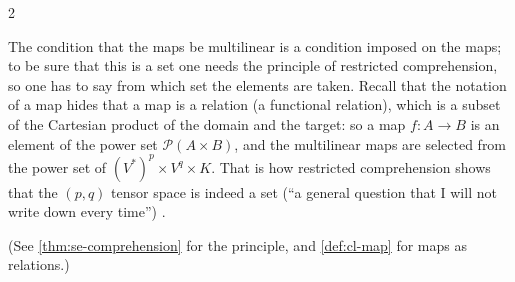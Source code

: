 \begin{paracol}{2}
\begin{secondary}
The condition that the maps be multilinear is a condition imposed on the maps; to be sure that this is a set one needs the principle of restricted comprehension, so one has to say from which set the elements are taken. Recall that the notation of a map hides that a map is a relation (a functional relation), which is a subset of the Cartesian
product of the domain and the target: so a map $f\colon A\to B$ is an element of the power set $\mathcal P(A\times B)$, and the multilinear maps are selected from the power set of $(V^*)^p\times V^q\times K$. That is how restricted comprehension shows that the $(p,q)$ tensor space is indeed a set (``a general question that I will not
write down every time'') .
\end{secondary}
(See \cref{thm:se-comprehension} for the principle, and \cref{def:cl-map} for maps as relations.)


\end{paracol}
